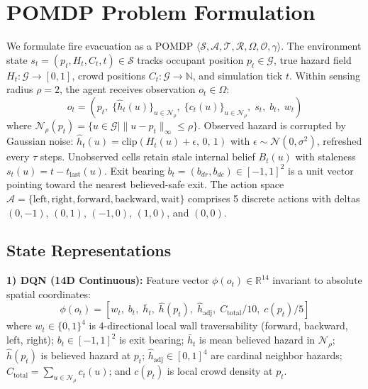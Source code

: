 \documentclass[10pt,twocolumn]{article}
\begin{document}
\section{POMDP Problem Formulation}
We formulate fire evacuation as a POMDP $\langle \mathcal{S}, \mathcal{A}, \mathcal{T}, \mathcal{R}, \Omega, \mathcal{O}, \gamma \rangle$. The environment state $s_t = (p_t, H_t, C_t, t) \in \mathcal{S}$ tracks occupant position $p_t \in \mathcal{G}$, true hazard field $H_t: \mathcal{G} \to [0, 1]$, crowd positions $C_t: \mathcal{G} \to \mathbb{N}$, and simulation tick $t$. Within sensing radius $\rho{=}2$, the agent receives observation $o_t \in \Omega$:
\begin{equation}
o_t = \left( p_t,\; \{\hat{h}_t(u)\}_{u \in \mathcal{N}_\rho},\; \{c_t(u)\}_{u \in \mathcal{N}_\rho},\; s_t,\; b_t,\; w_t \right)
\end{equation}
where $\mathcal{N}_\rho(p_t) = \{u \in \mathcal{G} \mid \|u - p_t\|_\infty \le \rho\}$. Observed hazard is corrupted by Gaussian noise: $\hat{h}_t(u) = \mathrm{clip}(H_t(u) + \epsilon,\, 0,\, 1)$ with $\epsilon \sim \mathcal{N}(0, \sigma^2)$, refreshed every $\tau$ steps. Unobserved cells retain stale internal belief $B_t(u)$ with staleness $s_t(u) = t - t_{\mathrm{last}}(u)$. Exit bearing $b_t = (b_{dr}, b_{dc}) \in [-1, 1]^2$ is a unit vector pointing toward the nearest believed-safe exit. The action space $\mathcal{A} = \{\text{left}, \text{right}, \text{forward}, \text{backward}, \text{wait}\}$ comprises 5 discrete actions with deltas $(0, -1)$, $(0, 1)$, $(-1, 0)$, $(1, 0)$, and $(0, 0)$.

\subsection{State Representations}
\textbf{1) DQN (14D Continuous):} Feature vector $\phi(o_t) \in \mathbb{R}^{14}$ invariant to absolute spatial coordinates:
\begin{equation}
\phi(o_t) = \left[ w_t,\; b_t,\; \bar{h}_t,\; \hat{h}(p_t),\; \hat{h}_{\mathrm{adj}},\; C_{\mathrm{total}}/10,\; c(p_t)/5 \right]
\end{equation}
where $w_t \in \{0, 1\}^4$ is 4-directional local wall traversability (forward, backward, left, right); $b_t \in [-1, 1]^2$ is exit bearing; $\bar{h}_t$ is mean believed hazard in $\mathcal{N}_\rho$; $\hat{h}(p_t)$ is believed hazard at $p_t$; $\hat{h}_{\mathrm{adj}} \in [0, 1]^4$ are cardinal neighbor hazards; $C_{\mathrm{total}} = \sum_{u \in \mathcal{N}_\rho} c_t(u)$; and $c(p_t)$ is local crowd density at $p_t$.
\end{document}
